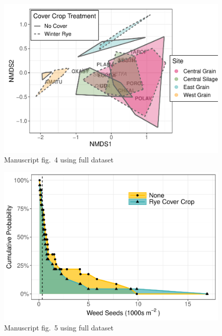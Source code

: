 \documentclass[]{article}
\begin{document}
\begin{figure}
\centering
\includegraphics{supp-mat_files/figure-latex/nmds-1.pdf}
\caption{Manuscript fig.~4 using full dataset}
\end{figure}

\newpage

\begin{figure}
\centering
\includegraphics{supp-mat_files/figure-latex/stochdom-1.pdf}
\caption{Manuscript fig.~5 using full dataset}
\end{figure}
\end{document}
